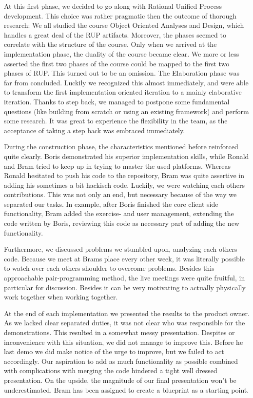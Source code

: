 At this first phase, we decided to go along with Rational Unified Process
development. This choice was rather pragmatic then the outcome of thorough
research: We all studied the course Object Oriented Analyses and Design, which
handles a great deal of the RUP artifacts. Moreover, the phases seemed to 
correlate with the structure of the course. Only when we arrived at the 
implementation phase, the duality of the course became clear. We more or less
asserted the first two phases of the course could be mapped to the first two
phases of RUP. This turned out to be an omission. The Elaboration phase was far
from concluded. Luckily we recognized this almost immediately, and were able
to transform the first implementation oriented iteration to a mainly 
elaborative iteration. Thanks to step back, we managed to postpone some
fundamental questions (like building from scratch or using an existing
framework) and perform some research. It was great to experience the
flexibility in the team, as the acceptance of taking a step back was
embraced immediately. 

During the construction phase, the characteristics mentioned before reinforced
quite clearly. Boris demonstrated his superior implementation skills, 
while Ronald and Bram tried to keep up in trying to master the used platforms. 
Whereas Ronald hesitated to push his code to the repository, Bram was quite 
assertive in adding his sometimes a bit hackisch code. Luckily, we were watching 
each others contributions. This was not only an end, but necessary because of
the way we separated our tasks. In example, after Boris finished the core client
side functionality, Bram added the exercise- and user management, extending the
code written by Boris, reviewing this code as necessary part of adding the new
functionality.

Furthermore, we discussed problems we stumbled upon, analyzing each others code.
Because we meet at Brams place every other week, it was literally possible to
watch over each others shoulder to overcome problems. Besides this approachable
pair-programming method, the live meetings were quite fruitful, in particular
for discussion. Besides it can be very motivating to actually physically work
together when working together. 

At the end of each implementation we presented the results to the product
owner. As we lacked clear separated duties, it was not clear who was responsible 
for the demonstrations. This resulted in a somewhat messy presentation. Despites
or inconvenience with this situation, we did not manage to improve this. Before 
he last demo we did make notice of the urge to improve, but we failed to act
accordingly. Our aspiration to add as much functionality as possible combined
with complications with merging the code hindered a tight well dressed 
presentation. On the upside, the magnitude of our final presentation won't be underestimated. Bram has been assigned to create a blueprint as a starting
point. 

